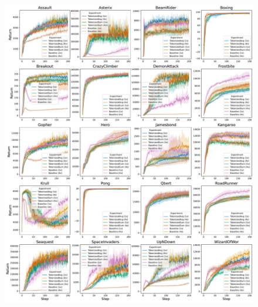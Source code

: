 \begin{figure}[h!]
    \centering
    \includegraphics[width=\textwidth]{figures/results/TokenizedRainbowImpalaAllGames.pdf}
    \caption{}
    \label{fig:rtokenizedRainbowImpalaAllGames}
\end{figure}



